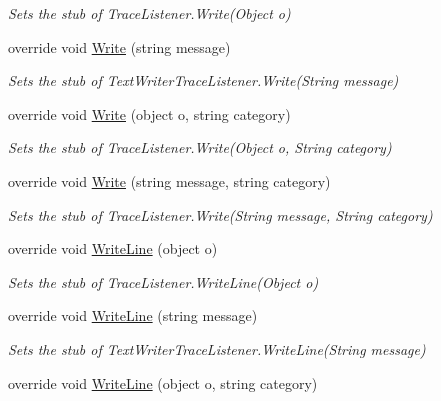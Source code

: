 \begin{DoxyCompactItemize}
\begin{DoxyCompactList}\small\item\em Sets the stub of Trace\-Listener.\-Write(\-Object o)\end{DoxyCompactList}\item 
override void \hyperlink{class_system_1_1_diagnostics_1_1_fakes_1_1_stub_console_trace_listener_a0b154732fca230f160f7357850b41035}{Write} (string message)
\begin{DoxyCompactList}\small\item\em Sets the stub of Text\-Writer\-Trace\-Listener.\-Write(\-String message)\end{DoxyCompactList}\item 
override void \hyperlink{class_system_1_1_diagnostics_1_1_fakes_1_1_stub_console_trace_listener_abff30bd88107215b6bbefbc17cc9fc6f}{Write} (object o, string category)
\begin{DoxyCompactList}\small\item\em Sets the stub of Trace\-Listener.\-Write(\-Object o, String category)\end{DoxyCompactList}\item 
override void \hyperlink{class_system_1_1_diagnostics_1_1_fakes_1_1_stub_console_trace_listener_a6c385678cf20237e1d2aad54fce0878e}{Write} (string message, string category)
\begin{DoxyCompactList}\small\item\em Sets the stub of Trace\-Listener.\-Write(\-String message, String category)\end{DoxyCompactList}\item 
override void \hyperlink{class_system_1_1_diagnostics_1_1_fakes_1_1_stub_console_trace_listener_aaea8da16e54690e656a72810eda15b2a}{Write\-Line} (object o)
\begin{DoxyCompactList}\small\item\em Sets the stub of Trace\-Listener.\-Write\-Line(\-Object o)\end{DoxyCompactList}\item 
override void \hyperlink{class_system_1_1_diagnostics_1_1_fakes_1_1_stub_console_trace_listener_a2083ea0bc03300cc5bb9ed73e3c17d0a}{Write\-Line} (string message)
\begin{DoxyCompactList}\small\item\em Sets the stub of Text\-Writer\-Trace\-Listener.\-Write\-Line(\-String message)\end{DoxyCompactList}\item 
override void \hyperlink{class_system_1_1_diagnostics_1_1_fakes_1_1_stub_console_trace_listener_a28bb774f20a4779685758c0da2346e00}{Write\-Line} (object o, string category)

\end{DoxyCompactItemize}
